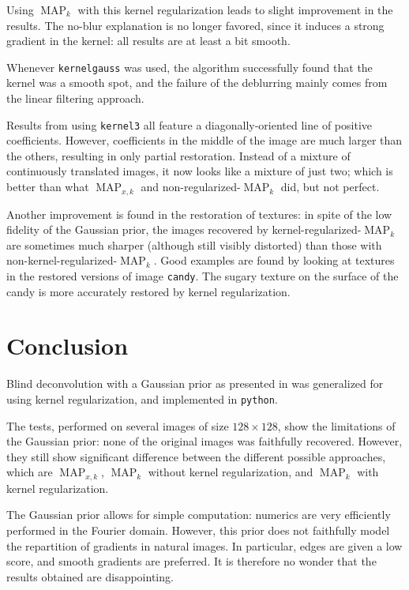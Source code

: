 \documentclass[english,a4paper]{article}
\theoremstyle{plain}
\theoremstyle{definition}
\theoremstyle{remark}
\DeclareMathOperator{\MAP}{MAP}
\begin{document}
\begin{itemize}
	Using $\MAP_k$ with this kernel regularization leads to slight improvement in the results. The no-blur explanation is no longer favored, since it induces a strong gradient in the kernel: all results are at least a bit smooth.
	
	Whenever \texttt{kernelgauss} was used, the algorithm successfully found that the kernel was a smooth spot, and the failure of the deblurring mainly comes from the linear filtering approach.
	
	Results from using \texttt{kernel3} all feature a diagonally-oriented line of positive coefficients. However, coefficients in the middle of the image are much larger than the others, resulting in only partial restoration. Instead of a mixture of continuously translated images, it now looks like a mixture of just two; which is better than what $\MAP_{x,k}$ and non-regularized-$\MAP_k$ did, but not perfect.
	
	Another improvement is found in the restoration of textures: in spite of the low fidelity of the Gaussian prior, the images recovered by kernel-regularized-$\MAP_k$ are sometimes much sharper (although still visibly distorted) than those with non-kernel-regularized-$\MAP_k$.
	Good examples are found by looking at textures in the restored versions of image \texttt{candy}. The sugary texture on the surface of the candy is more accurately restored by kernel regularization.
	
	
\end{itemize}


\section{Conclusion}

Blind deconvolution with a Gaussian prior as presented in \cite{levin2009understanding,levin2011efficient} was generalized for using kernel regularization, and implemented in \texttt{python}.

The tests, performed on several images of size $128\times 128$, show the limitations of the Gaussian prior: none of the original images was faithfully recovered.
However, they still show significant difference between the different possible approaches, which are $\MAP_{x,k}$, $\MAP_k$ without kernel regularization, and $\MAP_k$ with kernel regularization.

The Gaussian prior allows for simple computation: numerics are very efficiently performed in the Fourier domain. However, this prior does not faithfully model the repartition of gradients in natural images. In particular, edges are given a low score, and smooth gradients are preferred. It is therefore no wonder that the results obtained are disappointing.
\end{document}
